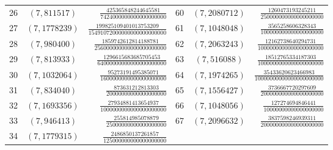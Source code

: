 \documentclass[11pt]{article}
\theoremstyle{remark}
\numberwithin{equation}{section}
\begin{document}
\begin{longtable}{rcr@{\qquad}rcr}
26 & $(7,811517)$ & $\frac{425365848244645581}{7424000000000000000000}$ & 60 & $(7,2080712)$ & $\frac{1260473193245211}{250000000000000000000}$\\[2pt]
27 & $(7,1778239)$ & $\frac{199825109401013753209}{15491072000000000000000000}$ & 61 & $(7,1048048)$ & $\frac{3565258606328343}{100000000000000000000}$\\[2pt]
28 & $(7,980400)$ & $\frac{1859742612814188781}{256000000000000000000000}$ & 62 & $(7,2063243)$ & $\frac{12162738640294731}{1000000000000000000000}$\\[2pt]
29 & $(7,813933)$ & $\frac{1296615683685705453}{64000000000000000000000}$ & 63 & $(7,516088)$ & $\frac{18512765334187303}{1000000000000000000000}$\\[2pt]
30 & $(7,1032064)$ & $\frac{95273191495385071}{1600000000000000000000}$ & 64 & $(7,1974265)$ & $\frac{35433620623466983}{10000000000000000000000}$\\[2pt]
31 & $(7,834040)$ & $\frac{873631212813303}{20000000000000000000}$ & 65 & $(7,1556427)$ & $\frac{3736667720297609}{200000000000000000000}$\\[2pt]
32 & $(7,1693356)$ & $\frac{27934881413654937}{1000000000000000000000}$ & 66 & $(7,1048056)$ & $\frac{127274694846441}{10000000000000000000}$\\[2pt]
33 & $(7,946413)$ & $\frac{255814985078879}{25000000000000000000}$ & 67 & $(7,2096632)$ & $\frac{3837598246939311}{200000000000000000000}$\\[2pt]
34 & $(7,1779315)$ & $\frac{2486850137261857}{125000000000000000000}$ &  &  & \\[2pt]
\end{longtable}
\endgroup
\end{document}
